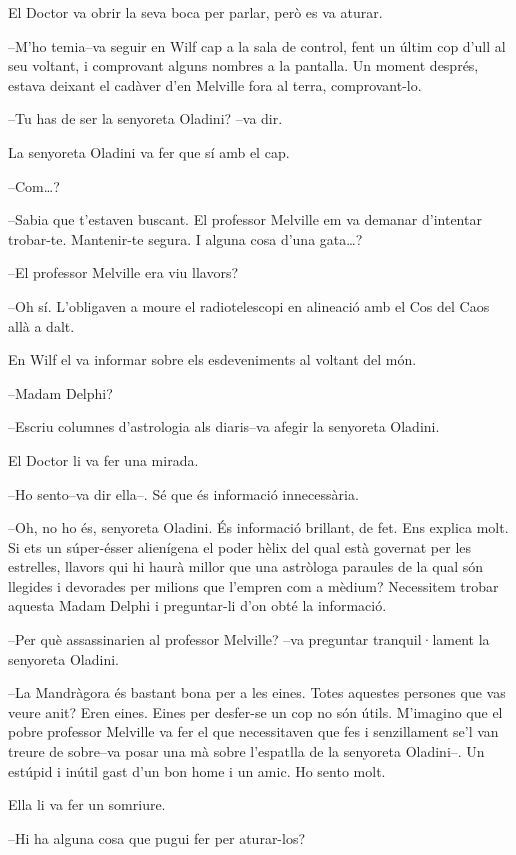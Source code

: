 El Doctor va obrir la seva boca per parlar, però es va aturar.

--M'ho temia--va seguir en Wilf cap a la sala de control, fent un últim
cop d'ull al seu voltant, i comprovant alguns nombres a la pantalla. Un
moment després, estava deixant el cadàver d'en Melville fora al terra,
comprovant-lo.

--Tu has de ser la senyoreta Oladini? --va dir.

La senyoreta Oladini va fer que sí amb el cap.

--Com\ldots{}?

--Sabia que t'estaven buscant. El professor Melville em va demanar
d'intentar trobar-te. Mantenir-te segura. I alguna cosa d'una
gata\ldots{}?

--El professor Melville era viu llavors?

--Oh sí. L'obligaven a moure el radiotelescopi en alineació amb el Cos
del Caos allà a dalt.

En Wilf el va informar sobre els esdeveniments al voltant del món.

--Madam Delphi?

--Escriu columnes d'astrologia als diaris--va afegir la senyoreta
Oladini.

El Doctor li va fer una mirada.

--Ho sento--va dir ella--. Sé que és informació innecessària.

--Oh, no ho és, senyoreta Oladini. És informació brillant, de fet. Ens
explica molt. Si ets un súper-ésser alienígena el poder hèlix del qual
està governat per les estrelles, llavors qui hi haurà millor que una
astròloga paraules de la qual són llegides i devorades per milions que
l'empren com a mèdium? Necessitem trobar aquesta Madam Delphi i
preguntar-li d'on obté la informació.

--Per què assassinarien al professor Melville? --va preguntar
tranquil·lament la senyoreta Oladini.

--La Mandràgora és bastant bona per a les eines. Totes aquestes persones
que vas veure anit? Eren eines. Eines per desfer-se un cop no són útils.
M'imagino que el pobre professor Melville va fer el que necessitaven que
fes i senzillament se'l van treure de sobre--va posar una mà sobre
l'espatlla de la senyoreta Oladini--. Un estúpid i inútil gast d'un bon
home i un amic. Ho sento molt.

Ella li va fer un somriure.

--Hi ha alguna cosa que pugui fer per aturar-los?

